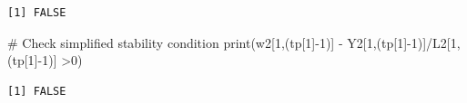 \documentclass[
  letterpaper,
  DIV=11,
  numbers=noendperiod]{scrreprt}
\newenvironment{Shaded}{\begin{snugshade}}{\end{snugshade}}
\newcommand{\CommentTok}[1]{\textcolor[rgb]{0.37,0.37,0.37}{#1}}
\newcommand{\DecValTok}[1]{\textcolor[rgb]{0.68,0.00,0.00}{#1}}
\newcommand{\FunctionTok}[1]{\textcolor[rgb]{0.28,0.35,0.67}{#1}}
\newcommand{\NormalTok}[1]{\textcolor[rgb]{0.00,0.23,0.31}{#1}}
\newcommand{\SpecialCharTok}[1]{\textcolor[rgb]{0.37,0.37,0.37}{#1}}
\begin{document}
\begin{verbatim}
[1] FALSE
\end{verbatim}

\begin{Shaded}
\begin{Highlighting}[]
\CommentTok{\# Check simplified stability condition}
\FunctionTok{print}\NormalTok{(w2[}\DecValTok{1}\NormalTok{,(tp[}\DecValTok{1}\NormalTok{]}\SpecialCharTok{{-}}\DecValTok{1}\NormalTok{)] }\SpecialCharTok{{-}}\NormalTok{ Y2[}\DecValTok{1}\NormalTok{,(tp[}\DecValTok{1}\NormalTok{]}\SpecialCharTok{{-}}\DecValTok{1}\NormalTok{)]}\SpecialCharTok{/}\NormalTok{L2[}\DecValTok{1}\NormalTok{,(tp[}\DecValTok{1}\NormalTok{]}\SpecialCharTok{{-}}\DecValTok{1}\NormalTok{)] }\SpecialCharTok{\textgreater{}}\DecValTok{0}\NormalTok{)}
\end{Highlighting}
\end{Shaded}

\begin{verbatim}
[1] FALSE
\end{verbatim}
\end{document}
